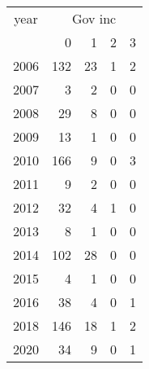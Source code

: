 \footnotesize\begin{tabular}[t]{lrrrr}
\toprule
\multicolumn{1}{c}{year} & \multicolumn{4}{c}{Gov inc} \\
\cmidrule(l{3pt}r{3pt}){1-1} \cmidrule(l{3pt}r{3pt}){2-5}
  & 0 & 1 & 2 & 3\\
\midrule
2006 & 132 & 23 & 1 & 2\\
2007 & 3 & 2 & 0 & 0\\
2008 & 29 & 8 & 0 & 0\\
2009 & 13 & 1 & 0 & 0\\
2010 & 166 & 9 & 0 & 3\\
2011 & 9 & 2 & 0 & 0\\
2012 & 32 & 4 & 1 & 0\\
2013 & 8 & 1 & 0 & 0\\
2014 & 102 & 28 & 0 & 0\\
2015 & 4 & 1 & 0 & 0\\
2016 & 38 & 4 & 0 & 1\\
2018 & 146 & 18 & 1 & 2\\
2020 & 34 & 9 & 0 & 1\\
\bottomrule
\end{tabular}
